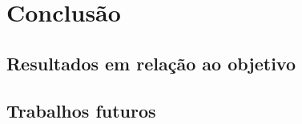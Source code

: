 \chapter{Conclusão}

    \section{Resultados em relação ao objetivo}

    \section{Trabalhos futuros}
